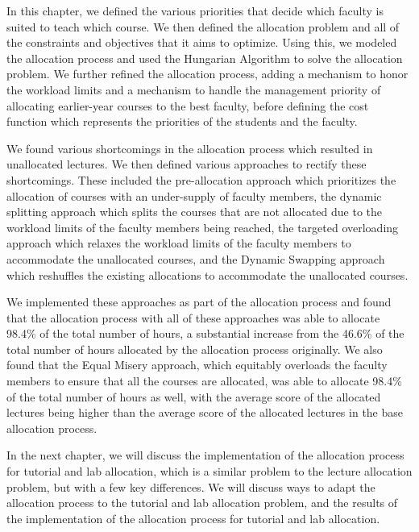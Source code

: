 In this chapter, we defined the various priorities that decide which faculty is suited to teach which course. We then defined the allocation problem and all of the constraints and objectives that it aims to optimize. Using this, we modeled the allocation process and used the Hungarian Algorithm to solve the allocation problem. We further refined the allocation process, adding a mechanism to honor the workload limits and a mechanism to handle the management priority of allocating earlier-year courses to the best faculty, before defining the cost function which represents the priorities of the students and the faculty.

We found various shortcomings in the allocation process which resulted in unallocated lectures. We then defined various approaches to rectify these shortcomings. These included the pre-allocation approach which prioritizes the allocation of courses with an under-supply of faculty members, the dynamic splitting approach which splits the courses that are not allocated due to the workload limits of the faculty members being reached, the targeted overloading approach which relaxes the workload limits of the faculty members to accommodate the unallocated courses, and the Dynamic Swapping approach which reshuffles the existing allocations to accommodate the unallocated courses.

We implemented these approaches as part of the allocation process and found that the allocation process with all of these approaches was able to allocate 98.4\% of the total number of hours, a substantial increase from the 46.6\% of the total number of hours allocated by the allocation process originally. We also found that the Equal Misery approach, which equitably overloads the faculty members to ensure that all the courses are allocated, was able to allocate 98.4\% of the total number of hours as well, with the average score of the allocated lectures being higher than the average score of the allocated lectures in the base allocation process.

In the next chapter, we will discuss the implementation of the allocation process for tutorial and lab allocation, which is a similar problem to the lecture allocation problem, but with a few key differences. We will discuss ways to adapt the allocation process to the tutorial and lab allocation problem, and the results of the implementation of the allocation process for tutorial and lab allocation.
